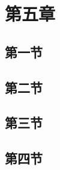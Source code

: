 \chapter{第五章} \label{ch:chapter_5}


\section{第一节}

\blindtext


\section{第二节}

\blindtext


\section{第三节}

\blindtext


\section{第四节}

\blindtext
